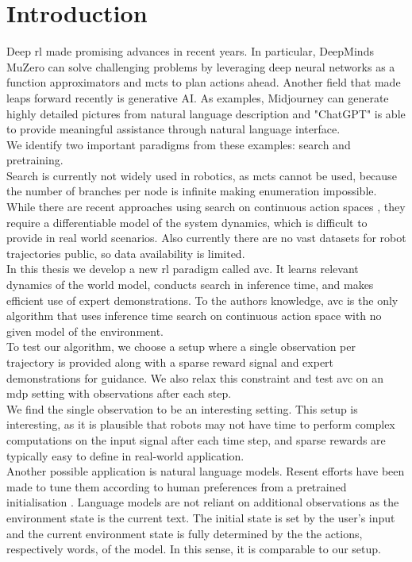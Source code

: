 \chapter{Introduction}
\label{chapter:Introduction}
Deep \ac{rl} made promising advances in recent years. In particular, DeepMinds MuZero \cite{MUZero} can solve challenging problems by leveraging deep neural networks as a function 
approximators and \ac{mcts} to plan actions ahead. 
Another field that made leaps forward recently is generative AI. As examples, Midjourney \cite{midjourney} 
can generate highly detailed pictures from natural 
language description and "ChatGPT" is able to provide meaningful assistance through natural language interface. \\
We identify two important paradigms from these examples: search and pretraining. \\
Search is currently not widely used in robotics, as \ac{mcts} cannot be used, because the number of branches per node is infinite making enumeration impossible. While there are recent approaches 
using search on continuous action spaces \cite{Manna2022} \cite{Lee_Jeon_Kim_Kim_2020}, they require a differentiable model of the system dynamics, which is difficult to provide in real world scenarios. 
Also currently there are no vast datasets for robot trajectories public, so data availability is limited.\\ 
In this thesis we develop a new \ac{rl} 
paradigm called \ac{avc}. It learns relevant dynamics of the world model, conducts search in inference time, and makes efficient use of expert demonstrations. 
To the authors knowledge, \ac{avc} is the only algorithm that uses inference time search on continuous action space with no given model of the environment.\\
To test our algorithm, we choose a setup where a single observation per trajectory is provided along with a sparse reward signal and expert demonstrations for guidance. 
We also relax this constraint and test \ac{avc} on an \ac{mdp} setting with observations after each step.\\

We find the single observation to be an interesting setting. This setup is interesting, as it is plausible that robots may not have time to perform complex computations 
on the input signal after each time step, and sparse rewards are typically easy to define in real-world application.\\
Another possible application is natural language models. Resent efforts have been made to tune 
them according to human preferences from a pretrained initialisation \cite{cite:ChatGPT}. Language models are not reliant on additional observations as the environment state is the current 
text. The initial state is set by the user's input and the current environment state is fully determined by the the actions, respectively words, of the model. 
In this sense, it is comparable to our setup.\\


